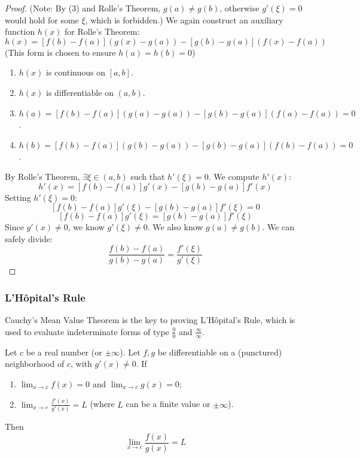 \documentclass[oneside]{book}
\begin{document}
\begin{proof}
(Note: By (3) and Rolle's Theorem, $g(a) \neq g(b)$, otherwise $g'(\xi)=0$ would hold for some $\xi$, which is forbidden.)
We again construct an auxiliary function $h(x)$ for Rolle's Theorem:
\[
h(x) = [f(b) - f(a)](g(x) - g(a)) - [g(b) - g(a)](f(x) - f(a))
\]
(This form is chosen to ensure $h(a)=h(b)=0$)
\begin{enumerate}
    \item $h(x)$ is continuous on $[a, b]$.
    \item $h(x)$ is differentiable on $(a, b)$.
    \item $h(a) = [f(b) - f(a)](g(a) - g(a)) - [g(b) - g(a)](f(a) - f(a)) = 0$.
    \item $h(b) = [f(b) - f(a)](g(b) - g(a)) - [g(b) - g(a)](f(b) - f(a)) = 0$.
\end{enumerate}
By Rolle's Theorem, $\exists \xi \in (a, b)$ such that $h'(\xi) = 0$.
We compute $h'(x)$:
\[
h'(x) = [f(b) - f(a)]g'(x) - [g(b) - g(a)]f'(x)
\]
Setting $h'(\xi) = 0$:
\[
[f(b) - f(a)]g'(\xi) - [g(b) - g(a)]f'(\xi) = 0
\]
\[
[f(b) - f(a)]g'(\xi) = [g(b) - g(a)]f'(\xi)
\]
Since $g'(x) \neq 0$, we know $g'(\xi) \neq 0$. We also know $g(a) \neq g(b)$. We can safely divide:
\[
\frac{f(b) - f(a)}{g(b) - g(a)} = \frac{f'(\xi)}{g'(\xi)}
\]
\end{proof}

\subsubsection{L'Hôpital's Rule}

Cauchy's Mean Value Theorem is the key to proving L'Hôpital's Rule, which is used to evaluate indeterminate forms of type $\frac{0}{0}$ and $\frac{\infty}{\infty}$.

\begin{theorem}
\label{thm:lhopital_zero_en}
Let $c$ be a real number (or $\pm\infty$). Let $f, g$ be differentiable on a (punctured) neighborhood of $c$, with $g'(x) \neq 0$.
If
\begin{enumerate}
    \item $\lim_{x \to c} f(x) = 0$ and $\lim_{x \to c} g(x) = 0$;
    \item $\lim_{x \to c} \frac{f'(x)}{g'(x)} = L$ (where $L$ can be a finite value or $\pm\infty$).
\end{enumerate}
Then
\[
\lim_{x \to c} \frac{f(x)}{g(x)} = L
\]
\end{theorem}
\end{document}

